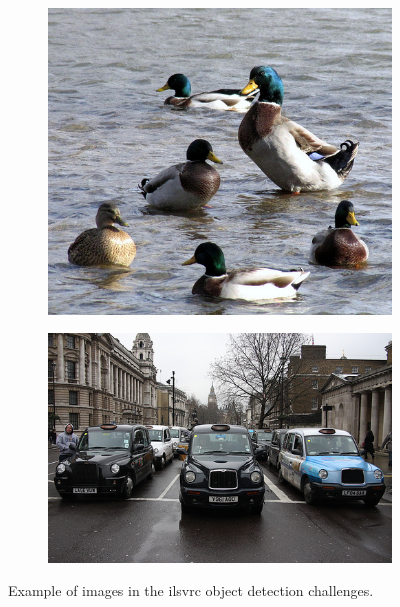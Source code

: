 \begin{figure}[H]
    \centering
    \begin{subfigure}[b]{0.4\textwidth}
        \center
        \includegraphics[width=\textwidth]{Figs/Problem/in1.jpeg}
        \caption{}\label{}
    \end{subfigure}
    \begin{subfigure}[b]{0.4\textwidth}
        \center
        \includegraphics[width=\textwidth]{Figs/Problem/in2.jpeg}
        \caption{}\label{}
    \end{subfigure}
    \caption{Example of images in the \gls{ilsvrc} object detection challenges.}
    \label{fig:imagenet_ex}
\end{figure} 

